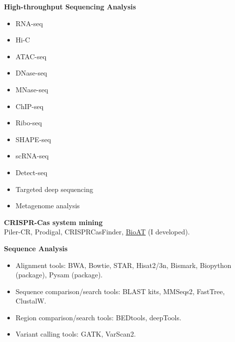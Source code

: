 \textbf{High-throughput Sequencing Analysis}
\vspace{-1em}
\begin{multicols}{3} %
\begin{itemize}
    \item RNA-seq
    \item Hi-C
    \item ATAC-seq
    \item DNase-seq
\end{itemize}  
  
\columnbreak %
  
\begin{itemize}  
    \item MNase-seq
    \item ChIP-seq
    \item Ribo-seq
    \item SHAPE-seq
\end{itemize}  
  
\columnbreak %
  
\begin{itemize}  
    \item scRNA-seq
    \item Detect-seq
    \item Targeted deep sequencing
    \item Metagenome analysis
\end{itemize}
\end{multicols}

\textbf{CRISPR-Cas system mining}\\
Piler-CR, Prodigal, CRISPRCasFinder, \href{https://github.com/hermanzhaozzzz/bioat}{BioAT} (I developed).


\textbf{Sequence Analysis}
\begin{itemize}
    \item Alignment tools: BWA, Bowtie, STAR, Hisat2/3n, Bismark, Biopython (package), Pysam (package).
    \item Sequence comparison/search tools: BLAST kits, MMSeqs2, FastTree, ClustalW.
    \item Region comparison/search tools: BEDtools, deepTools.
    \item Variant calling tools: GATK, VarScan2.
\end{itemize}

